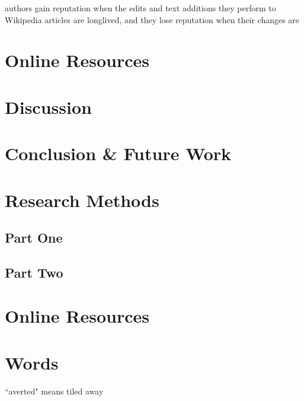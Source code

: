 \documentclass[12pt]{article}
\begin{document}
\cite{adler2007content} authors gain reputation when the edits and text
additions they perform to Wikipedia articles are longlived, and they lose reputation when their changes are

\section{Online Resources}\label{sec:Resources}


\section{Discussion}\label{sec:Discussion}


\section{Conclusion \& Future Work}\label{sec:Conclusion}

\newpage

 


\appendix

\section{Research Methods}

\subsection{Part One}



\subsection{Part Two}


\section{Online Resources}


\section{Words}
``averted" means tiled away
\end{document}
